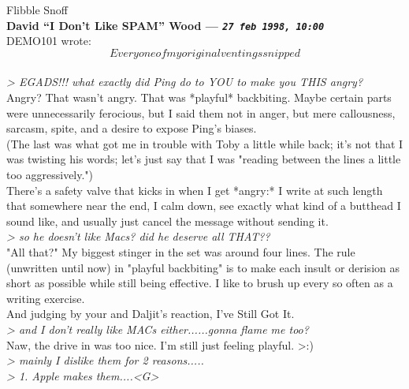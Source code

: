 \documentclass[11pt,twoside,a4paper]{article}
\begin{document}
\begin{multicols*}{2}
Flibble Snoff~\\

 
		
	
		
\textbf{David ``I Don't Like SPAM'' Wood --- \emph{\texttt{27 feb 1998, 10:00}}}~\\

DEMO101 wrote:~\\
\[Every one of my original ventings snipped\]~\\
\emph{> EGADS!!!  what exactly did Ping do to YOU to make you THIS angry?}~\\

Angry? That wasn't angry. That was *playful* backbiting. Maybe certain parts were unnecessarily ferocious, but I said them not in anger, but mere callousness, sarcasm, spite, and a desire to expose Ping's biases.~\\

(The last was what got me in trouble with Toby a little while back; it's not that I was twisting his words; let's just say that I was "reading between the lines a little too aggressively.")~\\

There's a safety valve that kicks in when I get *angry:* I write at such length that somewhere near the end, I calm down, see exactly what kind of a butthead I sound like, and usually just cancel the message without sending it.~\\

\emph{> so he doesn't like Macs?  did he deserve all THAT??}~\\

"All that?" My biggest stinger in the set was around four lines. The rule (unwritten until now) in "playful backbiting" is to make each insult or derision as short as possible while still being effective. I like to brush up every so often as a writing exercise.~\\

And judging by your and Daljit's reaction, I've Still Got It.~\\

\emph{> and I don't really like MACs either......gonna flame me too?}~\\

Naw, the drive in was too nice. I'm still just feeling playful. >:)~\\

\emph{> mainly I dislike them for 2 reasons.....}~\\
\emph{> 1.  Apple makes them....<G>}~\\


\end{multicols*}
\end{document}
